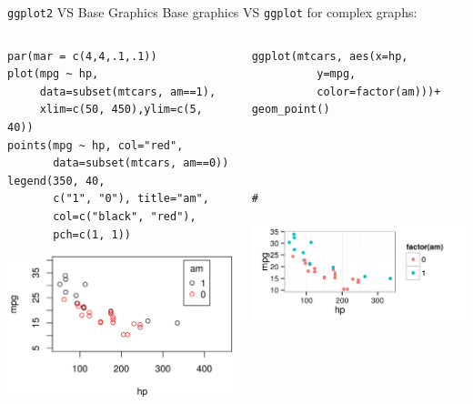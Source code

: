 \documentclass[table,smaller]{beamer}
\begin{document}
\begin{frame}[fragile,label=sec-1-9]{\texttt{ggplot2} VS Base Graphics}
 Base graphics VS \texttt{ggplot} for complex graphs:
\begin{columns}
\begin{column}{0.5\textwidth}

\begin{columns}  \begin{block}{}

\begin{verbatim}
par(mar = c(4,4,.1,.1))
plot(mpg ~ hp,
     data=subset(mtcars, am==1),
     xlim=c(50, 450),ylim=c(5, 40))
points(mpg ~ hp, col="red",
       data=subset(mtcars, am==0))
legend(350, 40,
       c("1", "0"), title="am",
       col=c("black", "red"),
       pch=c(1, 1))
\end{verbatim}

\includegraphics[width=.9\linewidth]{images/baseComplex1.png}

\end{block} \end{columns}
\end{column}
\begin{column}{0.5\textwidth}

\begin{columns}  \begin{block}{}

\begin{verbatim}
ggplot(mtcars, aes(x=hp,
	      y=mpg,
	      color=factor(am)))+
geom_point()




#
\end{verbatim}

\includegraphics[width=.9\linewidth]{images/ggplotComplex1.png}


\end{block}
\end{columns}
\end{column}
\end{columns}
\end{frame}
\end{document}
